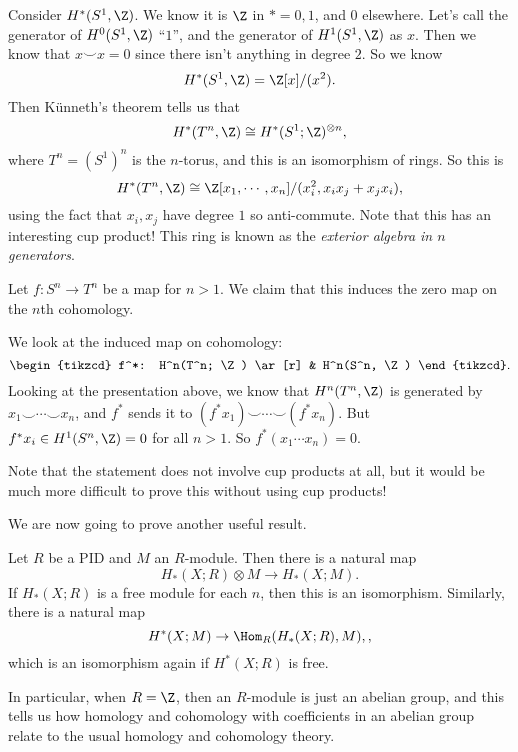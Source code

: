 \documentclass[a4paper]{article}
\begin{document}
\begin{eg}
  Consider $H^*(S^1, \Z)$. We know it is $\Z$ in $* = 0, 1$, and $0$ elsewhere. Let's call the generator of $H^0(S^1, \Z)$ ``$1$'', and the generator of $H^1(S^1, \Z)$ as $x$. Then we know that $x \smile x = 0$ since there isn't anything in degree $2$. So we know
  \[
    H^*(S^1, \Z) = \Z[x]/(x^2).
  \]
  Then K\"unneth's theorem tells us that
  \[
    H^*(T^n, \Z) \cong H^*(S^1; \Z)^{\otimes n},
  \]
  where $T^n = (S^1)^n$ is the $n$-torus, and this is an isomorphism of rings. So this is
  \[
    H^*(T^n, \Z) \cong \Z[x_1, \cdots, x_n]/(x_i^2, x_i x_j + x_j x_i),
  \]
  using the fact that $x_i, x_j$ have degree $1$ so anti-commute. Note that this has an interesting cup product! This ring is known as the \emph{exterior algebra in $n$ generators}.
\end{eg}

\begin{eg}
  Let $f: S^n \to T^n$ be a map for $n > 1$. We claim that this induces the zero map on the $n$th cohomology.

  We look at the induced map on cohomology:
  \[
    \begin{tikzcd}
      f^*: H^n(T^n; \Z) \ar[r] & H^n(S^n, \Z)
    \end{tikzcd}.
  \]
  Looking at the presentation above, we know that $H^n(T^n, \Z)$ is generated by $x_1 \smile \cdots \smile x_n$, and $f^*$ sends it to $(f^* x_1) \smile \cdots \smile (f^* x_n)$. But $f^*x_i \in H^1(S^n, \Z) = 0$ for all $n > 1$. So $f^* (x_1 \cdots x_n) = 0$.
\end{eg}
Note that the statement does not involve cup products at all, but it would be much more difficult to prove this without using cup products!

We are now going to prove another useful result.
\begin{thm}
  Let $R$ be a PID and $M$ an $R$-module. Then there is a natural map
  \[
    H_*(X; R)\otimes M \to H_*(X; M).
  \]
  If $H_*(X; R)$ is a free module for each $n$, then this is an isomorphism. Similarly, there is a natural map
  \[
    H^*(X; M) \to \Hom_R(H_*(X; R), M),,
  \]
  which is an isomorphism again if $H^*(X; R)$ is free.
\end{thm}
In particular, when $R = \Z$, then an $R$-module is just an abelian group, and this tells us how homology and cohomology with coefficients in an abelian group relate to the usual homology and cohomology theory.
\end{document}
